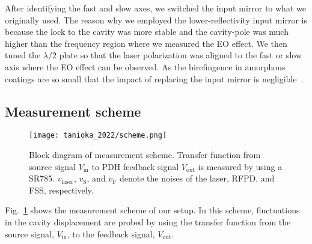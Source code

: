 After identifying the fast and slow axes, we switched the input mirror to what we originally used.
The reason why we employed the lower-reflectivity input mirror is because the lock to the cavity was more stable and the cavity-pole was much higher than the frequency region where we measured the EO effect.
We then tuned the $\lambda/2$ plate so that the laser polarization was aligned to the fast or slow axis where the EO effect can be observed.
As the birefingence in amorphous coatings are so small that the impact of replacing the input mirror is negligible~\cite{Bielsa2009}.


\subsection{Measurement scheme}

\begin{figure}[htbp]
    \centering
\texttt{[image: tanioka\_2022/scheme.png]}
\caption{Block diagram of measurement scheme. Transfer function from source signal $V_{\mathrm{in}}$ to PDH feedback signal $V_{\mathrm{out}}$ is measured by using a SR785. $v_{\mathrm{laser}}$, $v_{\mathrm{S}}$, and $v_{\mathrm{F}}$ denote the noises of the laser, RFPD, and FSS, respectively.}
\label{fig.scheme}
\end{figure}

Fig.~\ref{fig.scheme} shows the measurement scheme of our setup. 
In this scheme, fluctuations in the cavity displacement are probed by using the transfer function from the source signal, $V_{\mathrm{in}}$, to the feedback signal, $V_{\mathrm{out}}$.


